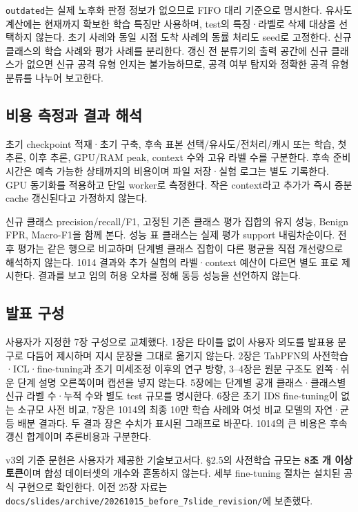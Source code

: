 \texttt{outdated\allowbreak{}}는 실제 노후화 판정 정보가 없으므로 FIFO 대리 기준으로 명시한다. 유사도 계산에는 현재까지 확보한 학습 특징만 사용하며, test의 특징·라벨로 삭제 대상을 선택하지 않는다. 초기 사례와 동일 시점 도착 사례의 동률 처리도 seed로 고정한다. 신규 클래스의 학습 사례와 평가 사례를 분리한다. 갱신 전 분류기의 출력 공간에 신규 클래스가 없으면 신규 공격 유형 인지는 불가능하므로, 공격 여부 탐지와 정확한 공격 유형 분류를 나누어 보고한다.

\subsection{비용 측정과 결과 해석}
초기 checkpoint 적재·초기 구축, 후속 표본 선택/\allowbreak{}유사도/\allowbreak{}전처리/\allowbreak{}캐시 또는 학습, 첫 추론, 이후 추론, GPU/\allowbreak{}RAM peak, context 수와 고유 라벨 수를 구분한다. 후속 준비 시간은 예측 가능한 상태까지의 비용이며 파일 저장·실험 로그는 별도 기록한다. GPU 동기화를 적용하고 단일 worker로 측정한다. 작은 context라고 추가가 즉시 증분 cache 갱신된다고 가정하지 않는다.

신규 클래스 precision/\allowbreak{}recall/\allowbreak{}F1, 고정된 기존 클래스 평가 집합의 유지 성능, Benign FPR, Macro-F1을 함께 본다. 성능 표 클래스는 실제 평가 support 내림차순이다. 전후 평가는 같은 행으로 비교하며 단계별 클래스 집합이 다른 평균을 직접 개선량으로 해석하지 않는다. 1014 결과와 추가 실험의 라벨·context 예산이 다르면 별도 표로 제시한다. 결과를 보고 임의 허용 오차를 정해 동등 성능을 선언하지 않는다.

\subsection{발표 구성}
사용자가 지정한 7장 구성으로 교체했다. 1장은 타이틀 없이 사용자 의도를 발표용 문구로 다듬어 제시하며 지시 문장을 그대로 옮기지 않는다. 2장은 TabPFN의 사전학습·ICL·fine-tuning과 초기 미세조정 이후의 연구 방향, 3–4장은 원문 구조도 왼쪽·쉬운 단계 설명 오른쪽이며 캡션을 넣지 않는다. 5장에는 단계별 공개 클래스·클래스별 신규 라벨 수·누적 수와 별도 test 규모를 명시한다. 6장은 초기 IDS fine-tuning이 없는 소규모 사전 비교, 7장은 1014의 최종 10만 학습 사례와 여섯 비교 모델의 자연·균등 배분 결과다. 두 결과 장은 수치가 표시된 그래프로 바꾼다. 1014의 큰 비용은 후속 갱신 합계이며 추론비용과 구분한다.

v3의 기준 문헌은 사용자가 제공한 기술보고서다. §2.5의 사전학습 규모는 \textbf{8조 개 이상 토큰}이며 합성 데이터셋의 개수와 혼동하지 않는다. 세부 fine-tuning 절차는 설치된 공식 구현으로 확인한다. 이전 25장 자료는 \texttt{docs/\allowbreak{}\allowbreak{}sli\allowbreak{}des/\allowbreak{}\allowbreak{}arch\allowbreak{}ive/\allowbreak{}\allowbreak{}2026\allowbreak{}1015\_\allowbreak{}\allowbreak{}bef\allowbreak{}ore\_\allowbreak{}\allowbreak{}7sli\allowbreak{}de\_\allowbreak{}\allowbreak{}revis\allowbreak{}ion/\allowbreak{}\allowbreak{}}에 보존했다.

